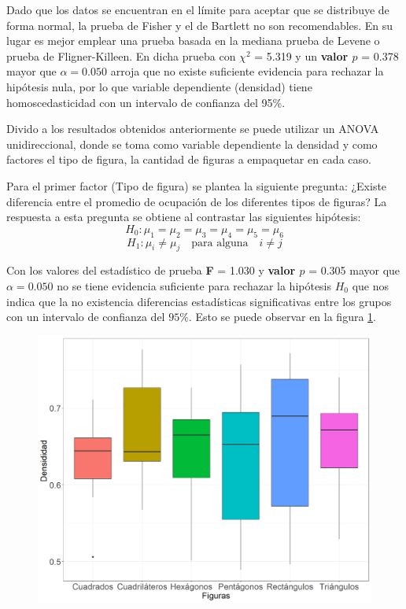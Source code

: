 \documentclass[5p,times]{elsarticle}
\begin{document}
Dado que los datos se encuentran en el límite para aceptar que se distribuye de forma normal, la prueba de Fisher y el de Bartlett no son recomendables. En su lugar es mejor emplear una prueba basada en la mediana prueba de Levene o prueba de Fligner-Killeen. En dicha prueba con $\chi^2$ = 5.319 y un \textbf{valor $p$} = 0.378 mayor que $\alpha = 0.050$ arroja que no existe suficiente evidencia para rechazar la hipótesis nula, por lo que variable dependiente (densidad) tiene homoscedasticidad con un intervalo de confianza del 95\%.

Divido a los resultados obtenidos anteriormente se puede utilizar un ANOVA unidireccional, donde se toma como variable dependiente la densidad y como factores el tipo de figura, la cantidad de figuras a empaquetar en cada caso.

Para el primer factor (Tipo de figura) se plantea la siguiente pregunta: ¿Existe diferencia entre el promedio de ocupación de los diferentes tipos de figuras? La respuesta a esta pregunta se obtiene al contrastar las siguientes hipótesis:
\begin{equation}
H_{0}:\mu_{1}=\mu_{2}=\mu_{3}=\mu_{4}=\mu_{5}=\mu_{6}    
\end{equation}
\begin{equation}
 H_{1}:\mu_{i}\neq\mu_{j}\quad \mbox{para alguna} \quad i\neq j
\end{equation}

 Con los valores del estadístico de prueba \textbf{F} = 1.030 y \textbf{valor $p$} = 0.305 mayor que $\alpha = 0.050$ no se tiene evidencia suficiente para rechazar la hipótesis $H_{0}$ que nos indica que la no existencia diferencias estadísticas significativas entre los grupos con un intervalo de confianza del $95\%$. Esto se puede observar en la figura \ref{fig:boxplotssc1}.

	\begin{figure}
				\begin{center}
					\includegraphics[scale=0.35]{figuras/Sseccboxplot.png}
					\label{fig:boxplotssc1}
				\end{center}
			\end{figure}
			
\end{document}
